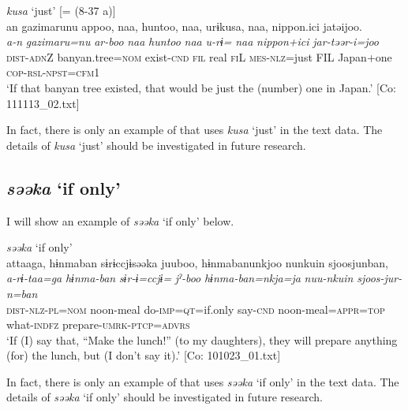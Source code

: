 \ea\label{ex:10.28}   \textit{kusa} ‘just’ [= (8-37 a)]\\
      \glll    an  gazimarunu  appoo,  naa,  huntoo,  naa,   urɨkusa,  naa,  {\textbar}nippon.ici{\textbar}  jatəijoo.\\
    \textit{a-n}  \textit{gazimaru=nu}  \textit{ar-boo}  \textit{naa}  \textit{huntoo}  \textit{naa} \textit{u-rɨ=}  \textit{naa}  \textit{nippon+ici}  \textit{jar-təər-i=joo}\\
    \textsc{dist}-\textsc{adn}Z  banyan.tree=\textsc{nom}  exist-\textsc{cnd}  \textsc{fil}  real  \textsc{fi}L \textsc{mes}-\textsc{nlz}=just  FIL  Japan+one  \textsc{cop}-\textsc{rsl}-\textsc{npst}=\textsc{cfm}1\\
\glt     ‘If that banyan tree existed, that would be just the (number) one in Japan.’  [Co: 111113\_02.txt]
\z

In fact, there is only an example of  that uses \textit{kusa} ‘just’ in the text data. The details of \textit{kusa} ‘just’ should be investigated in future research.

\subsection{\textit{səəka} ‘if only’}\label{sec:10.1.8}

I will show an example of \textit{səəka} ‘if only’ below.

\ea\label{ex:10.29}   \textit{səəka} ‘if only’\\
      \glll    attaaga,  hɨnmaban  sɨrɨccjɨsəəka  juuboo,  hɨnmabanunkjoo  nunkuin  sjoosjunban,\\
    \textit{a-rɨ-taa=ga}  \textit{hɨnma-ban}  \textit{sɨr-ɨ=ccjɨ=}  \textit{jˀ-boo}  \textit{hɨnma-ban=nkja=ja}  \textit{nuu-nkuin}  \textit{sjoos-jur-n=ban}\\
    \textsc{dist}-\textsc{nlz}-\textsc{pl}=\textsc{nom}  noon-meal  do-\textsc{imp}=\textsc{qt}=if.only  say-\textsc{cnd}   noon-meal=\textsc{appr}=\textsc{top}  what-\textsc{indfz}  prepare-\textsc{umrk}-\textsc{ptcp}=\textsc{advrs}\\
\glt     ‘If (I) say that, “Make the lunch!” (to my daughters), they will prepare anything (for) the lunch, but (I don’t say it).’  [Co: 101023\_01.txt]
\z

In fact, there is only an example of  that uses \textit{səəka} ‘if only’ in the text data. The details of \textit{səəka} ‘if only’ should be investigated in future research.


